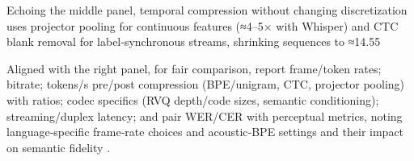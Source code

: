 Echoing the middle panel, temporal compression without changing discretization uses projector pooling for continuous features (≈4–5× with Whisper) and CTC blank removal for label‑synchronous streams, shrinking sequences to ≈14.55%

Aligned with the right panel, for fair comparison, report frame/token rates; bitrate; tokens/s pre/post compression (BPE/unigram, CTC, projector pooling) with ratios; codec specifics (RVQ depth/code sizes, semantic conditioning); streaming/duplex latency; and pair WER/CER with perceptual metrics, noting language‑specific frame‑rate choices and acoustic‑BPE settings and their impact on semantic fidelity \cite{li2024effectivenessacousticbpedecoderonlytts,ye2024codecdoesmatterexploringsemanticshortcom,zhang2025impactframeratesspeechtokenizercasestudy}.

